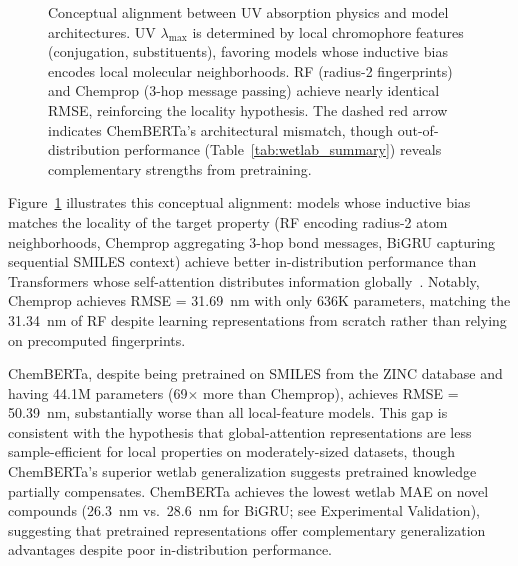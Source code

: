 \documentclass[journal=jcisd8,manuscript=article]{achemso}
\begin{document}
\begin{figure}[htbp]
    \caption{Conceptual alignment between UV absorption physics and model architectures. UV $\lambda_{\max}$ is determined by local chromophore features (conjugation, substituents), favoring models whose inductive bias encodes local molecular neighborhoods. RF (radius-2 fingerprints) and Chemprop (3-hop message passing) achieve nearly identical RMSE, reinforcing the locality hypothesis. The dashed red arrow indicates ChemBERTa's architectural mismatch, though out-of-distribution performance (Table~\ref{tab:wetlab_summary}) reveals complementary strengths from pretraining.}
    \label{fig:local_vs_global}
\end{figure}

Figure~\ref{fig:local_vs_global} illustrates this conceptual alignment: models whose inductive bias matches the locality of the target property (RF encoding radius-2 atom neighborhoods, Chemprop aggregating 3-hop bond messages, BiGRU capturing sequential SMILES context) achieve better in-distribution performance than Transformers whose self-attention distributes information globally~\cite{chenMolecularLanguage2023, jiang2023trangru}.
Notably, Chemprop achieves RMSE = 31.69~nm with only 636K parameters, matching the 31.34~nm of RF despite learning representations from scratch rather than relying on precomputed fingerprints.

ChemBERTa, despite being pretrained on SMILES from the ZINC database and having 44.1M parameters (69$\times$ more than Chemprop), achieves RMSE = 50.39~nm, substantially worse than all local-feature models.
This gap is consistent with the hypothesis that global-attention representations are less sample-efficient for local properties on moderately-sized datasets, though ChemBERTa's superior wetlab generalization suggests pretrained knowledge partially compensates.
ChemBERTa achieves the lowest wetlab MAE on novel compounds (26.3~nm vs.\ 28.6~nm for BiGRU; see Experimental Validation), suggesting that pretrained representations offer complementary generalization advantages despite poor in-distribution performance.
\end{document}
